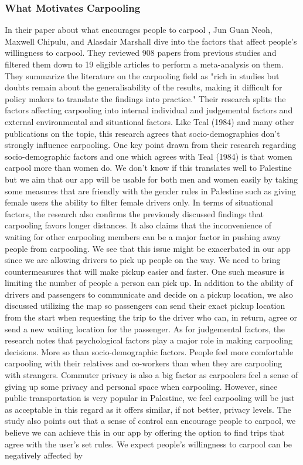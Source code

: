 \documentclass[a4paper, 12pt]{article} %
\begin{document}
            \subsubsection{What Motivates Carpooling}
                In their paper about what encourages people to carpool \cite{soton381789}, Jun Guan Neoh, Maxwell Chipulu, and Alasdair Marshall dive into the factors that affect people's willingness to carpool. They reviewed 908 papers from previous studies and filtered them down to 19 eligible articles to perform a meta-analysis on them. They summarize the literature on the carpooling field as "rich in studies but doubts remain about the generalisability of the results, making it difficult for policy makers to translate the findings into practice."
                Their research splits the factors affecting carpooling into internal individual and judgemental factors and external environmental and situational factors. Like Teal (1984) \cite{carpool_who_why_how} and many other publications on the topic, this research agrees that socio-demographics don't strongly influence carpooling.  One key point drawn from their research regarding socio-demographic factors and one which agrees with Teal (1984) \cite{carpool_who_why_how} is that women carpool more than women do. We don't know if this translates well to Palestine but we aim that our app will be usable for both men and women easily by taking some measures that are friendly with the gender rules in Palestine such as giving female users the ability to filter female drivers only. In terms of situational factors, the research also confirms the previously discussed findings that carpooling favors longer distances. It also claims that the inconvenience of waiting for other carpooling members can be a major factor in pushing away people from carpooling. We see that this issue might be exacerbated in our app since we are allowing drivers to pick up people on the way. We need to bring countermeasures that will make pickup easier and faster. One such measure is limiting the number of people a person can pick up. In addition to the ability of drivers and passengers to communicate and decide on a pickup location, we also discussed utilizing the map so passengers can send their exact pickup location from the start when requesting the trip to the driver who can, in return, agree or send a new waiting location for the passenger. As for judgemental factors, the research notes that psychological factors play a major role in making carpooling decisions. More so than socio-demographic factors. People feel more comfortable carpooling with their relatives and co-workers than when they are carpooling with strangers. Commuter privacy is also a big factor as carpoolers feel a sense of giving up some privacy and personal space when carpooling. However, since public transportation is very popular in Palestine, we feel carpooling will be just as acceptable in this regard as it offers similar, if not better, privacy levels. The study also points out that a sense of control can encourage people to carpool, we believe we can achieve this in our app by offering the option to find trips that agree with the user's set rules. We expect people's willingness to carpool can be negatively affected by 
\end{document}
